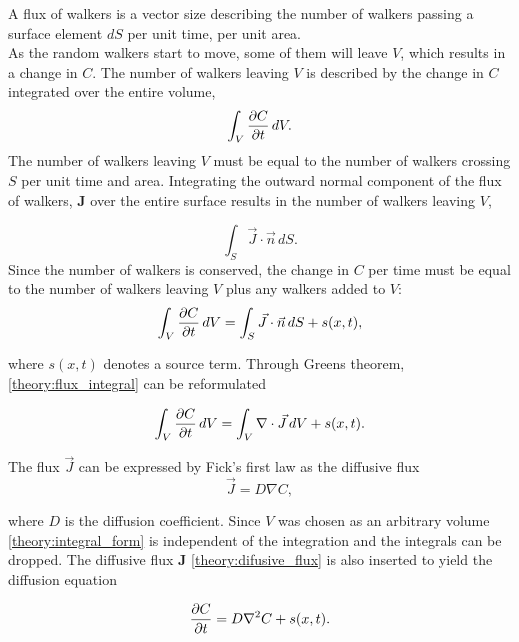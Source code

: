 \noindent A flux of walkers is a vector size describing the number of walkers passing a surface element $dS$ per unit time, per unit area. \\

\noindent As the random walkers start to move, some of them will leave $V$, which results in a change in $C$. 
The number of walkers leaving $V$ is described by the change in $C$ integrated over the entire volume,
\begin{equation}
 \int_V \frac{\partial C}{\partial t}\,dV.
\end{equation}
The number of walkers leaving $V$ must be equal to the number of walkers crossing $S$ per unit time and area. Integrating the outward normal component of the flux of walkers, $\mathbf{J}$ over the entire surface results in the number of walkers leaving $V$,

\begin{equation}\label{theory:flux_integral}
 \int_S\vec{J}\cdot \vec{n}\,dS.
\end{equation}
Since the number of walkers is conserved, the change in $C$ per time must be equal to the number of walkers leaving $V$ plus any walkers added to $V$:
\begin{equation}\label{theory:diffusion_integral_form}
 \int_V \frac{\partial C}{\partial t}\,dV = \int_S\vec{J}\cdot \vec{n}\,dS + s(x,t),
\end{equation}

\noindent where $s(x,t)$ denotes a source term. 
Through Greens theorem, \eqref{theory:flux_integral} can be reformulated 

\begin{equation}\label{theory:integral_form}
 \int_V \frac{\partial C}{\partial t}\,dV = \int_V\nabla\cdot\vec{J}\,dV +s(x,t).
\end{equation}

\noindent The flux $\vec{J}$ can be expressed by Fick's first law as the diffusive flux 
\begin{equation}\label{theory:difusive_flux}
 \vec J = D\nabla C,
\end{equation}

\noindent where $D$ is the diffusion coefficient. Since $V$ was chosen as an arbitrary volume \eqref{theory:integral_form} is independent of the integration and the integrals can be dropped. 
The diffusive flux $\mathbf{J}$ \eqref{theory:difusive_flux} is also inserted to yield the diffusion equation

\begin{equation}\label{theory:diffusion_equation}
 \frac{\partial C}{\partial t} = D\nabla^2 C +s(x,t).
\end{equation}

